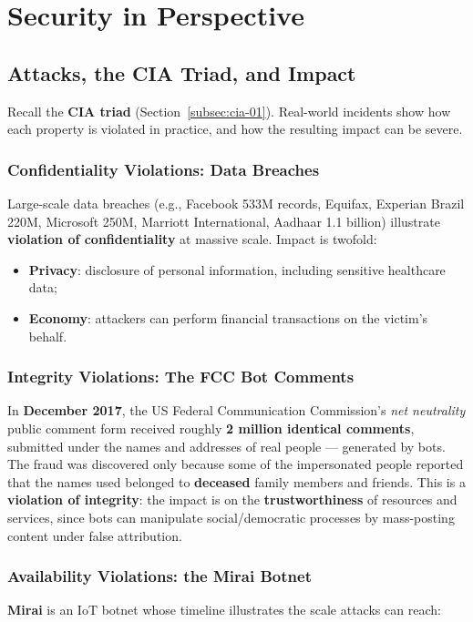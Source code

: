\documentclass[12pt, a4paper]{article}
\begin{document}
\section{Security in Perspective}

\subsection{Attacks, the CIA Triad, and Impact}

Recall the \textbf{CIA triad} (Section~\ref{subsec:cia-01}). Real-world incidents show how each property is violated in practice, and how the resulting impact can be severe.

\subsubsection{Confidentiality Violations: Data Breaches}
Large-scale data breaches (e.g., Facebook 533M records, Equifax, Experian Brazil 220M, Microsoft 250M, Marriott International, Aadhaar 1.1 billion) illustrate \textbf{violation of confidentiality} at massive scale. Impact is twofold:
\begin{itemize}
    \item \textbf{Privacy}: disclosure of personal information, including sensitive healthcare data;
    \item \textbf{Economy}: attackers can perform financial transactions on the victim's behalf.
\end{itemize}

\subsubsection{Integrity Violations: The FCC Bot Comments}
In \textbf{December 2017}, the US Federal Communication Commission's \emph{net neutrality} public comment form received roughly \textbf{2 million identical comments}, submitted under the names and addresses of real people — generated by bots. The fraud was discovered only because some of the impersonated people reported that the names used belonged to \textbf{deceased} family members and friends. This is a \textbf{violation of integrity}: the impact is on the \textbf{trustworthiness} of resources and services, since bots can manipulate social/democratic processes by mass-posting content under false attribution.

\subsubsection{Availability Violations: the Mirai Botnet}
\textbf{Mirai} is an IoT botnet whose timeline illustrates the scale attacks can reach:
\end{document}
